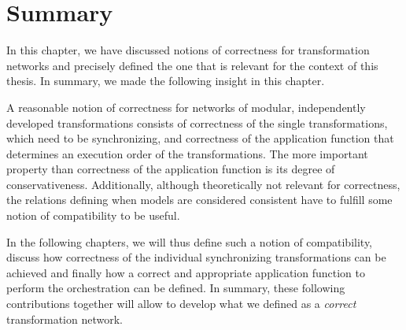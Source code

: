 \section{Summary}
\label{chap:correctness:summary}

In this chapter, we have discussed notions of correctness for transformation networks and precisely defined the one that is relevant for the context of this thesis.
In summary, we made the following insight in this chapter.

\begin{insight}
    A reasonable notion of correctness for networks of modular, independently developed transformations consists of correctness of the single transformations, which need to be synchronizing, and correctness of the application function that determines an execution order of the transformations.
    The more important property than correctness of the application function is its degree of conservativeness.
    Additionally, although theoretically not relevant for correctness, the relations defining when models are considered consistent have to fulfill some notion of compatibility to be useful.
\end{insight}

In the following chapters, we will thus define such a notion of compatibility, discuss how correctness of the individual synchronizing transformations can be achieved and finally how a correct and appropriate application function to perform the orchestration can be defined.
In summary, these following contributions together will allow to develop what we defined as a \emph{correct} transformation network.




